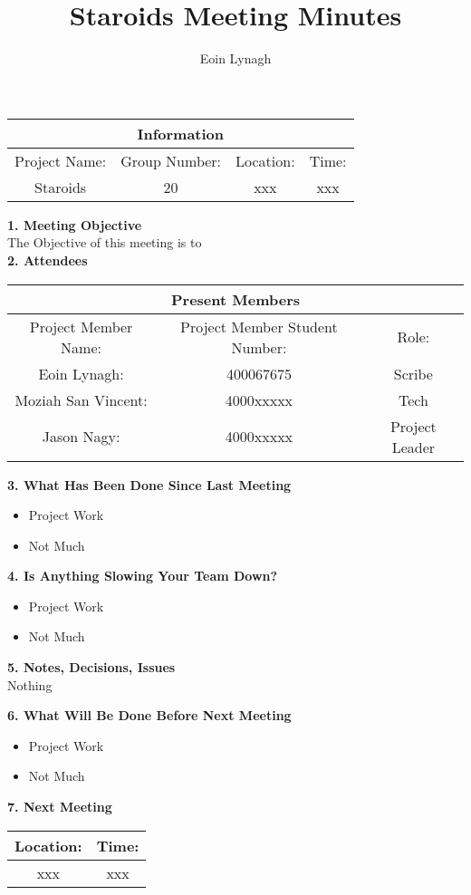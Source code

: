 \documentclass[12pt]{article}
\title{Staroids Meeting Minutes}
\author{Eoin Lynagh}
\begin{document}
\maketitle
\begin{center}
 \begin{tabular}{|c | c | c |  c |} 
 \hline
 \multicolumn{4}{|c|}{Information} \\
\hline
 Project Name: & Group Number: & Location: & Time: \\ 
 \hline
 Staroids & 20 & xxx & xxx \\
\hline
\end{tabular}
\end{center}
\begin{flushleft}
\textbf{1. Meeting Objective}\\
The Objective of this meeting is to\\

\textbf{2. Attendees}\\
\begin{center}
 \begin{tabular}{|c | c | c | } 
 \hline
 \multicolumn{3}{|c|}{Present Members} \\
\hline
 Project Member Name: & Project Member Student Number: & Role: \\ 
 \hline\hline
 Eoin Lynagh: & 400067675 & Scribe \\
\hline
Moziah San Vincent: & 4000xxxxx & Tech \\
\hline
 Jason Nagy: & 4000xxxxx & Project Leader \\
\hline
\end{tabular}
\end{center}

\textbf{3. What Has Been Done Since Last Meeting}\\
\begin{itemize}
\item Project Work
\item Not Much
\end{itemize}

\textbf{4. Is Anything Slowing Your Team Down?}\\
\begin{itemize}
\item Project Work
\item Not Much
\end{itemize}

\textbf{5. Notes, Decisions, Issues}\\
Nothing

\textbf{6. What Will Be Done Before Next Meeting}\\
\begin{itemize}
\item Project Work
\item Not Much
\end{itemize}

\textbf{7. Next Meeting}\\
\begin{center}
 \begin{tabular}{|c | c |} 
\hline
 Location: & Time: \\ 
 \hline
 xxx & xxx\\
\hline
\end{tabular}
\end{center}

\end{flushleft}
\end{document}
